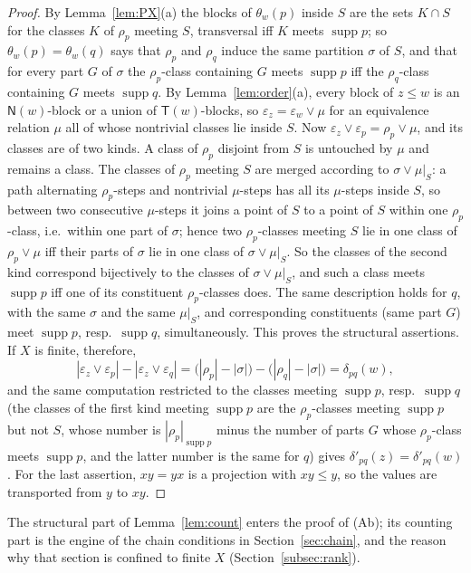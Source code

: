 \documentclass[11pt]{amsart}
\theoremstyle{definition}
\newcommand{\supp}{\operatorname{supp}}
\newcommand{\T}{\mathsf{T}}
\newcommand{\N}{\mathsf{N}}
\newcommand{\Kfour}{\textup{(Ab)}}     %
\begin{document}
\begin{proof}
By Lemma~\ref{lem:PX}(a) the blocks of $\theta_w(p)$ inside $S$ are the sets $K\cap S$ for the classes $K$ of $\rho_p$ meeting $S$, transversal iff $K$ meets $\supp p$; so $\theta_w(p)=\theta_w(q)$ says that $\rho_p$ and $\rho_q$ induce the same partition $\sigma$ of $S$, and that for every part $G$ of $\sigma$ the $\rho_p$-class containing $G$ meets $\supp p$ iff the $\rho_q$-class containing $G$ meets $\supp q$. By Lemma~\ref{lem:order}(a), every block of $z\le w$ is an $\N(w)$-block or a union of $\T(w)$-blocks, so $\varepsilon_z=\varepsilon_w\vee\mu$ for an equivalence relation $\mu$ all of whose nontrivial classes lie inside $S$. Now $\varepsilon_z\vee\varepsilon_p=\rho_p\vee\mu$, and its classes are of two kinds. A class of $\rho_p$ disjoint from $S$ is untouched by $\mu$ and remains a class. The classes of $\rho_p$ meeting $S$ are merged according to $\sigma\vee\mu|_S$: a path alternating $\rho_p$-steps and nontrivial $\mu$-steps has all its $\mu$-steps inside $S$, so between two consecutive $\mu$-steps it joins a point of $S$ to a point of $S$ within one $\rho_p$-class, i.e.\ within one part of $\sigma$; hence two $\rho_p$-classes meeting $S$ lie in one class of $\rho_p\vee\mu$ iff their parts of $\sigma$ lie in one class of $\sigma\vee\mu|_S$. So the classes of the second kind correspond bijectively to the classes of $\sigma\vee\mu|_S$, and such a class meets $\supp p$ iff one of its constituent $\rho_p$-classes does. The same description holds for $q$, with the same $\sigma$ and the same $\mu|_S$, and corresponding constituents (same part $G$) meet $\supp p$, resp.\ $\supp q$, simultaneously. This proves the structural assertions. If $X$ is finite, therefore,
\[
|\varepsilon_z\vee\varepsilon_p|-|\varepsilon_z\vee\varepsilon_q|=\bigl(|\rho_p|-|\sigma|\bigr)-\bigl(|\rho_q|-|\sigma|\bigr)=\delta_{pq}(w),
\]
and the same computation restricted to the classes meeting $\supp p$, resp.\ $\supp q$ (the classes of the first kind meeting $\supp p$ are the $\rho_p$-classes meeting $\supp p$ but not $S$, whose number is $|\rho_p|_{\supp p}$ minus the number of parts $G$ whose $\rho_p$-class meets $\supp p$, and the latter number is the same for $q$) gives $\delta'_{pq}(z)=\delta'_{pq}(w)$. For the last assertion, $xy=yx$ is a projection with $xy\le y$, so the values are transported from $y$ to $xy$.
\end{proof}

The structural part of Lemma~\ref{lem:count} enters the proof of \Kfour; its counting part is the engine of the chain conditions in Section~\ref{sec:chain}, and the reason why that section is confined to finite $X$ (Section~\ref{subsec:rank}).
\end{document}
